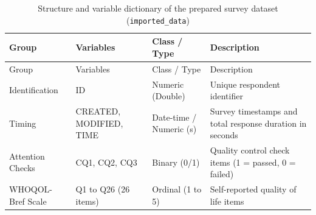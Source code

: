 \documentclass[
  letterpaper,
  DIV=11,
  numbers=noendperiod]{scrartcl}
\begin{document}
\protect{}\label{data-reading}
\begin{longtable}[]{@{}
  >{\raggedright\arraybackslash}p{}
  >{\raggedright\arraybackslash}p{}
  >{\raggedright\arraybackslash}p{}
  >{\raggedright\arraybackslash}p{}@{}}
\caption{Structure and variable dictionary of the prepared survey
dataset (\protect\texttt{imported\_data})}\tabularnewline
\toprule\noalign{}
\begin{minipage}[b]{\linewidth}\raggedright
Group
\end{minipage} & \begin{minipage}[b]{\linewidth}\raggedright
Variables
\end{minipage} & \begin{minipage}[b]{\linewidth}\raggedright
Class / Type
\end{minipage} & \begin{minipage}[b]{\linewidth}\raggedright
Description
\end{minipage} \\
\midrule\noalign{}
\endfirsthead
\toprule\noalign{}
\begin{minipage}[b]{\linewidth}\raggedright
Group
\end{minipage} & \begin{minipage}[b]{\linewidth}\raggedright
Variables
\end{minipage} & \begin{minipage}[b]{\linewidth}\raggedright
Class / Type
\end{minipage} & \begin{minipage}[b]{\linewidth}\raggedright
Description
\end{minipage} \\
\midrule\noalign{}
\endhead
\bottomrule\noalign{}
\endlastfoot
Identification & ID & Numeric (Double) & Unique respondent identifier \\
Timing & CREATED, MODIFIED, TIME & Date-time / Numeric (s) & Survey
timestamps and total response duration in seconds \\
Attention Checks & CQ1, CQ2, CQ3 & Binary (0/1) & Quality control check
items (1 = passed, 0 = failed) \\
WHOQOL-Bref Scale & Q1 to Q26 (26 items) & Ordinal (1 to 5) &
Self-reported quality of life items \\
\end{longtable}
\end{document}
